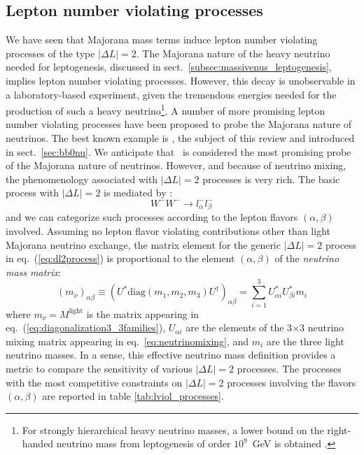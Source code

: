 

\subsection{\label{subsec:massivenus_lviolation}Lepton number violating processes}

We have seen that Majorana mass terms induce lepton number violating processes of the type $\lvert\Delta L\rvert=2$. The Majorana nature of the heavy neutrino needed for leptogenesis, discussed in sect.~\ref{subsec:massivenus_leptogenesis}, implies lepton number violating processes. However, this decay is unobservable in a laboratory-based experiment, given the tremendous energies needed for the production of such a heavy neutrino\footnote{For strongly hierarchical heavy neutrino masses, a lower bound on the right-handed neutrino mass from leptogenesis of order $10^9$~GeV is obtained \cite{Davidson:2002qv}.}. A number of more promising lepton number violating processes have been proposed to probe the Majorana nature of neutrinos. The best known example is \bbonu, the subject of this review and introduced in sect.~\ref{sec:bb0nu}. We anticipate that \bbonu\ is considered the most promising probe of the Majorana nature of neutrinos. However, and because of neutrino mixing, the phenomenology associated with $\lvert\Delta L\rvert=2$ processes is very rich. The basic process with $\lvert\Delta L\rvert=2$ is mediated by \cite{Atre:2005eb}:
\begin{equation}
W^-W^-\to l^-_{\alpha}l^-_{\beta}
\label{eq:dl2process}
\end{equation}
\noindent and we can categorize such processes according to the lepton flavors $(\alpha,\beta)$ involved. Assuming no lepton flavor violating contributions other than light Majorana neutrino exchange, the matrix element for the generic $\lvert\Delta L\rvert=2$ process in eq.~(\ref{eq:dl2process}) is proportional to the element $(\alpha,\beta)$ of the \emph{neutrino mass matrix}:
\begin{equation}
\left(m_{\nu}\right)_{\alpha\beta}\equiv \left(U^{\ast}\text{diag}(m_1,m_2,m_3)U^{\dagger}\right)_{\alpha\beta}=
 \sum_{i=1}^3 U^{\ast}_{\alpha i}U^{\ast}_{\beta i}m_i
\label{eq:mnu}
\end{equation}
\noindent where $m_{\nu}=M^{\text{light}}$ is the matrix appearing in eq.~(\ref{eq:diagonalization3_3families}), $U_{\alpha i}$ are the elements of the 3$\times$3 neutrino mixing matrix appearing in eq.~\ref{eq:neutrinomixing}, and $m_i$ are the three light neutrino masses. In a sense, this effective neutrino mass definition provides a metric to compare the sensitivity of various $\lvert\Delta L\rvert=2$ processes. The processes with the most competitive constraints on $\lvert\Delta L\rvert=2$ processes involving the flavors $(\alpha,\beta)$ are reported in table \ref{tab:lviol_processes}. \\

